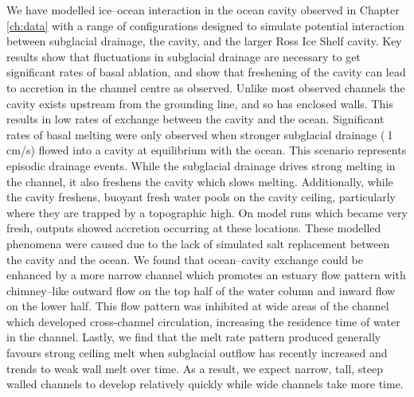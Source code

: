 We have modelled ice--ocean interaction in the ocean cavity observed in Chapter \ref{ch:data} with a range of configurations designed to simulate potential interaction between subglacial drainage, the cavity, and the larger Ross Ice Shelf cavity. Key results show that fluctuations in subglacial drainage are necessary to get significant rates of basal ablation, and show that freshening of the cavity can lead to accretion in the channel centre as observed. Unlike most observed channels the cavity exists upstream from the grounding line, and so has enclosed walls. This results in low rates of exchange between the cavity and the ocean. Significant rates of basal melting were only observed when stronger subglacial drainage ($\>$1 cm/s) flowed into a cavity at equilibrium with the ocean. This scenario represents episodic drainage events. While the subglacial drainage drives strong melting in the channel, it also freshens the cavity which slows melting.  Additionally, while the cavity freshens, buoyant fresh water pools on the cavity ceiling, particularly where they are trapped by a topographic high. On model runs which became very fresh, outputs showed accretion occurring at these locations. These modelled phenomena were caused due to the lack of simulated salt replacement between the cavity and the ocean. We found that ocean--cavity exchange could be enhanced by a more narrow channel which promotes an estuary flow pattern with chimney--like outward flow on the top half of the water column and inward flow on the lower half. This flow pattern was inhibited at wide areas of the channel which developed cross-channel circulation, increasing the residence time of water in the channel. Lastly, we find that the melt rate pattern produced generally favours strong ceiling melt when subglacial outflow has recently increased and trends to weak wall melt over time. As a result, we expect narrow, tall, steep walled channels to develop relatively quickly while wide channels take more time.
